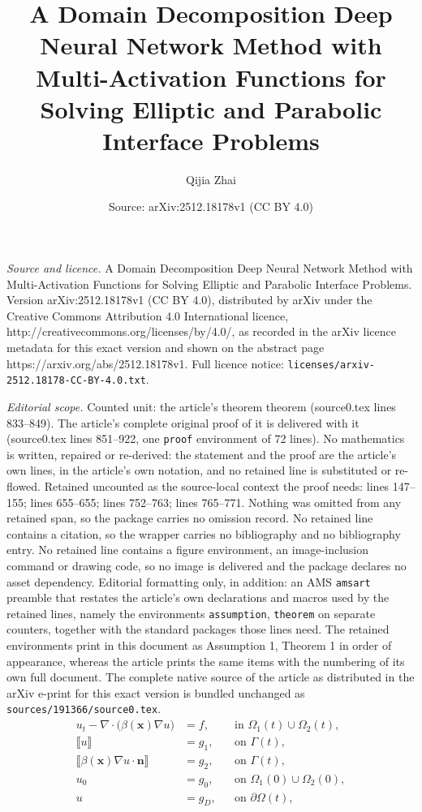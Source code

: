 \documentclass[10pt,a4paper]{amsart}
\title{A Domain Decomposition Deep Neural Network Method with Multi-Activation Functions for Solving Elliptic and Parabolic Interface Problems}
\author{Qijia Zhai}
\date{Source: arXiv:2512.18178v1 (CC BY 4.0)}
\begin{document}
\maketitle

\noindent\emph{Source and licence.} A Domain Decomposition Deep Neural Network Method with Multi-Activation Functions for Solving Elliptic and Parabolic Interface Problems. Version arXiv:2512.18178v1 (CC BY 4.0), distributed by arXiv under the Creative Commons Attribution 4.0 International licence, http://creativecommons.org/licenses/by/4.0/, as recorded in the arXiv licence metadata for this exact version and shown on the abstract page https://arxiv.org/abs/2512.18178v1. Full licence notice: \texttt{licenses/arxiv-2512.18178-CC-BY-4.0.txt}.\par\smallskip

\noindent\textit{Editorial scope.} Counted unit: the article's theorem theorem (source0.tex lines 833--849). The article's complete original proof of it is delivered with it (source0.tex lines 851--922, one \texttt{proof} environment of 72 lines). No mathematics is written, repaired or re-derived: the statement and the proof are the article's own lines, in the article's own notation, and no retained line is substituted or re-flowed.  Retained uncounted as the source-local context the proof needs: lines 147--155; lines 655--655; lines 752--763; lines 765--771.  Nothing was omitted from any retained span, so the package carries no omission record.  No retained line contains a citation, so the wrapper carries no bibliography and no bibliography entry.  No retained line contains a figure environment, an image-inclusion command or drawing code, so no image is delivered and the package declares no asset dependency.  Editorial formatting only, in addition: an AMS \texttt{amsart} preamble that restates the article's own declarations and macros used by the retained lines, namely the environments \texttt{assumption}, \texttt{theorem} on separate counters, together with the standard packages those lines need.  The retained environments print in this document as Assumption 1, Theorem 1 in order of appearance, whereas the article prints the same items with the numbering of its own full document.  The complete native source of the article as distributed in the arXiv e-print for this exact version is bundled unchanged as \texttt{sources/191366/source0.tex}.
\begin{equation}\label{modelpextenddnnpaowu}
\begin{aligned}
u_t - \nabla \cdot \bigl(\beta(\boldsymbol{x}) \nabla u\bigr) & = f, & & \text{in } \Omega_1(t) \cup \Omega_2(t), \\
\llbracket u \rrbracket & = g_1, & & \text{on } \Gamma(t), \\
\llbracket \beta(\boldsymbol{x}) \nabla u \cdot \boldsymbol{n} \rrbracket & = g_2, & & \text{on } \Gamma(t), \\
u_0 & = g_0, & & \text{on } \Omega_1(0) \cup \Omega_2(0),\\
u & = g_D, & & \text{on } \partial \Omega(t),
\end{aligned}
\end{equation}
\end{document}
